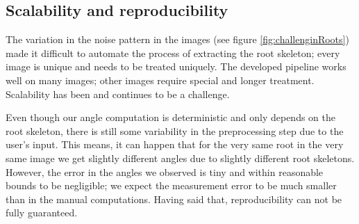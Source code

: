 



\subsection{Scalability and reproducibility}

The variation in the noise pattern in the images (see figure \ref{fig:challenginRoots}) made it difficult to automate the process of extracting the root skeleton; every image is unique and needs to be treated uniquely. The developed pipeline works well on many images; other images require special and longer treatment. Scalability has been and continues to be a challenge.

Even though our angle computation is deterministic %
and only depends on the root skeleton, there is still some variability in the preprocessing step due to the user's input. This means, it can happen that for the very same root in the very same image we get slightly different angles due to slightly different root skeletons. %
However, the error in the angles we observed is tiny and within reasonable bounds to be negligible; we expect the measurement error to be much smaller than in the manual computations. Having said that, reproducibility can not be fully guaranteed. %


